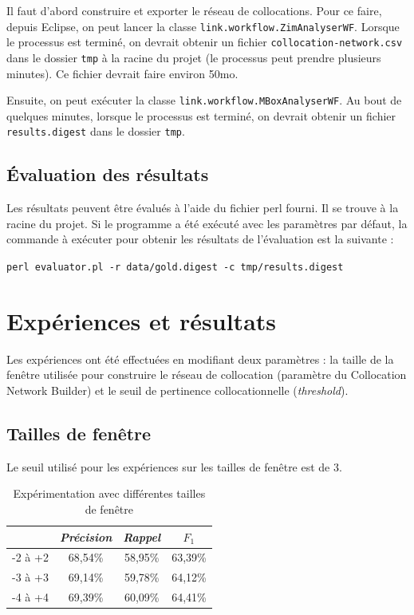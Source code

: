 \documentclass[a4paper]{article}
\begin{document}
Il faut d'abord construire et exporter le réseau de collocations. Pour ce faire, depuis Eclipse, on peut lancer la classe \texttt{link.workflow.ZimAnalyserWF}. Lorsque le processus est terminé, on devrait obtenir un fichier \texttt{collocation-network.csv} dans le dossier \texttt{tmp} à la racine du projet (le processus peut prendre plusieurs minutes). Ce fichier devrait faire environ 50mo.\newline

Ensuite, on peut exécuter la classe \texttt{link.workflow.MBoxAnalyserWF}. Au bout de quelques minutes, lorsque le processus est terminé, on devrait obtenir un fichier \texttt{results.digest} dans le dossier \texttt{tmp}.

\subsection{Évaluation des résultats}

Les résultats peuvent être évalués à l'aide du fichier perl fourni. Il se trouve à la racine du projet. Si le programme a été exécuté avec les paramètres par défaut, la commande à exécuter pour obtenir les résultats de l'évaluation est la suivante :\newline

\texttt{perl evaluator.pl -r data/gold.digest -c tmp/results.digest}

\section{Expériences et résultats}

Les expériences ont été effectuées en modifiant deux paramètres : la taille de la fenêtre utilisée pour construire le réseau de collocation (paramètre du Collocation Network Builder) et le seuil de pertinence collocationnelle (\textit{threshold}).

\subsection{Tailles de fenêtre}

Le seuil utilisé pour les expériences sur les tailles de fenêtre est de 3.

\FloatBarrier

\begin{table}[h]
	\centering
	\begin{tabular}{l|c|c|c|}
	\cline{2-4}
		                   & \textit{Précision} & \textit{Rappel} & \textit{$F_1$} \\ \hline
	\multicolumn{1}{|l|}{-2 à +2} & 68,54\% & 58,95\% & 63,39\% \\ \hline
	\multicolumn{1}{|l|}{-3 à +3} & 69,14\% & 59,78\% & 64,12\% \\ \hline
	\multicolumn{1}{|l|}{-4 à +4} & 69,39\% & 60,09\% & 64,41\% \\ \hline
	\end{tabular}
	\caption{Expérimentation avec différentes tailles de fenêtre}
\end{table}
\end{document}
